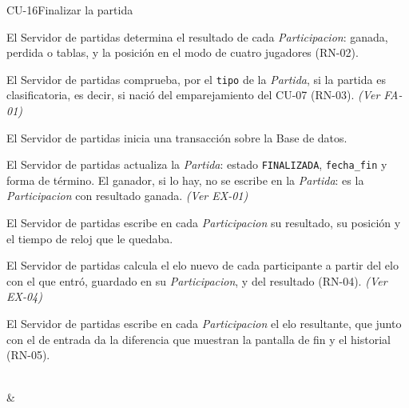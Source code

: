\begin{fichacu}{CU-16}{Finalizar la partida}
{\begin{cuenum}[start=1]
      \item El Servidor de partidas determina el resultado de cada \textit{Participacion}: ganada, perdida o tablas, y la posición en el modo de cuatro jugadores (\mbox{RN-02}).
      \item El Servidor de partidas comprueba, por el \texttt{tipo} de la \textit{Partida}, si la partida es clasificatoria, es decir, si nació del emparejamiento del \mbox{CU-07} (\mbox{RN-03}). \textit{(Ver \mbox{FA-01})}
      \item El Servidor de partidas inicia una transacción sobre la Base de datos.
      \item El Servidor de partidas actualiza la \textit{Partida}: estado \texttt{FINALIZADA}, \texttt{fecha\_\allowbreak{}fin} y forma de término. El ganador, si lo hay, no se escribe en la \textit{Partida}: es la \textit{Participacion} con resultado ganada. \textit{(Ver \mbox{EX-01})}
      \item El Servidor de partidas escribe en cada \textit{Participacion} su resultado, su posición y el tiempo de reloj que le quedaba.
      \item El Servidor de partidas calcula el elo nuevo de cada participante a partir del elo con el que entró, guardado en su \textit{Participacion}, y del resultado (\mbox{RN-04}). \textit{(Ver \mbox{EX-04})}
      \item El Servidor de partidas escribe en cada \textit{Participacion} el elo resultante, que junto con el de entrada da la diferencia que muestran la pantalla de fin y el historial (\mbox{RN-05}).
    \end{cuenum}} \\
   & 
\end{fichacu}
